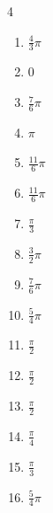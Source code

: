 \begin{multicols}{4}
\begin{enumerate}
  \item $\displaystyle \frac{4}{3}\pi$

  \item $\displaystyle 0$

  \item $\displaystyle \frac{7}{6}\pi$

  \item $\displaystyle \pi$

  \item $\displaystyle \frac{11}{6}\pi$

  \item $\displaystyle \frac{11}{6}\pi$

  \item $\displaystyle \frac{\pi}{3}$

  \item $\displaystyle \frac{3}{2}\pi$

  \item $\displaystyle \frac{7}{6}\pi$

  \item $\displaystyle \frac{5}{4}\pi$

  \item $\displaystyle \frac{\pi}{2}$

  \item $\displaystyle \frac{\pi}{2}$

  \item $\displaystyle \frac{\pi}{2}$

  \item $\displaystyle \frac{\pi}{4}$

  \item $\displaystyle \frac{\pi}{3}$

\columnbreak %

  \item $\displaystyle \frac{5}{4}\pi$


\end{enumerate}
\end{multicols}
